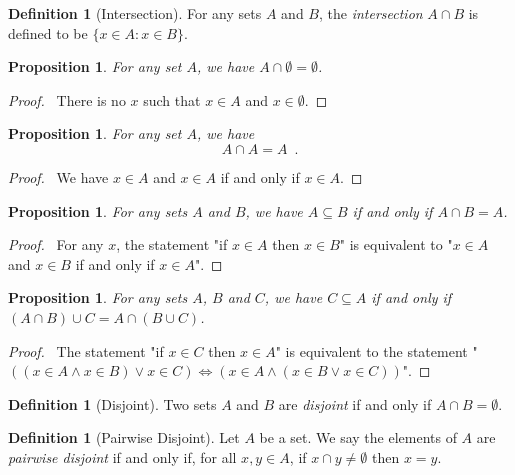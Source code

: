 \documentclass{report}
\let\qed\relax
\newtheorem{prop}[ax]{Proposition}
\theoremstyle{definition}
\newtheorem{df}[ax]{Definition}
\begin{document}
\begin{df}[Intersection]
For any sets $A$ and $B$, the \emph{intersection} $A \cap B$ is defined to be $\{ x \in A : x \in B \}$.
\end{df}

\begin{prop}
For any set $A$, we have $A \cap \emptyset = \emptyset$.
\end{prop}

\begin{proof}
\pf\ There is no $x$ such that $x \in A$ and $x \in \emptyset$. \qed
\end{proof}

\begin{prop}
For any set $A$, we have
\[ A \cap A = A \enspace . \]
\end{prop}

\begin{proof}
\pf\ We have $x \in A$ and $x \in A$ if and only if $x \in A$. \qed
\end{proof}

\begin{prop}
For any sets $A$ and $B$, we have $A \subseteq B$ if and only if $A \cap B = A$.
\end{prop}

\begin{proof}
\pf\ For any $x$, the statement "if $x \in A$ then $x \in B$" is equivalent to "$x \in A$ and $x \in B$ if and only if $x \in A$". \qed
\end{proof}

\begin{prop}
For any sets $A$, $B$ and $C$, we have $C \subseteq A$ if and only if $(A \cap B) \cup C = A \cap (B \cup C)$.
\end{prop}

\begin{proof}
\pf\ The statement "if $x \in C$ then $x \in A$" is equivalent to the statement "$((x \in A \wedge x \in B) \vee x \in C) \Leftrightarrow (x \in A \wedge (x \in B \vee x \in C))$". \qed
\end{proof}

\begin{df}[Disjoint]
Two sets $A$ and $B$ are \emph{disjoint} if and only if $A \cap B = \emptyset$.
\end{df}

\begin{df}[Pairwise Disjoint]
Let $A$ be a set. We say the elements of $A$ are \emph{pairwise disjoint} if and only if, for all $x, y \in A$, if $x \cap y \neq \emptyset$ then $x = y$.
\end{df}
\end{document}

